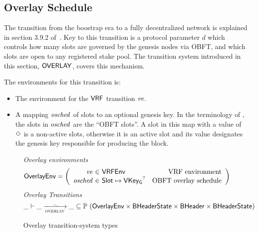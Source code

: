 \clearpage

\subsection{Overlay Schedule}
\label{sec:overlay-schedule}

The transition from the boostrap era to a fully decentralized network is explained in
section 3.9.2 of~\cite{delegation_design}.
Key to this transition is a protocol parameter $d$ which controls how many slots are governed by
the genesis nodes via OBFT, and which slots are open to any registered stake pool.
The transition system introduced in this section, $\mathsf{OVERLAY}$, covers this mechanism.

The environments for this transition is:
\begin{itemize}
  \item The environment for the $\mathsf{VRF}$ transition $\mathit{ve}$.
  \item A mapping $\mathit{osched}$ of slots to an optional genesis key.
    In the terminology of \cite{delegation_design},
    the slots in $\mathit{osched}$ are the ``OBFT slots''.
    A slot in this map with a value of $\Diamond$ is a non-active slots,
    otherwise it is an active slot and its value designates the genesis key
    responsible for producing the block.
\end{itemize}

\begin{figure}
  \emph{Overlay environments}
  \begin{equation*}
    \OverlayEnv =
    \left(
      \begin{array}{r@{~\in~}lr}
        \var{ve} & \VRFEnv & \text{VRF environment} \\
        \var{osched} & \Slot\mapsto\VKeyGen^? & \text{OBFT overlay schedule} \\
      \end{array}
    \right)
  \end{equation*}
  \emph{Overlay Transitions}
  \begin{equation*}
    \_ \vdash \var{\_} \trans{overlay}{\_} \var{\_} \subseteq
    \powerset (\OverlayEnv \times \BHeaderState \times \BHeader \times \BHeaderState)
  \end{equation*}
  \caption{Overlay transition-system types}
  \label{fig:ts-types:overlay}
\end{figure}

